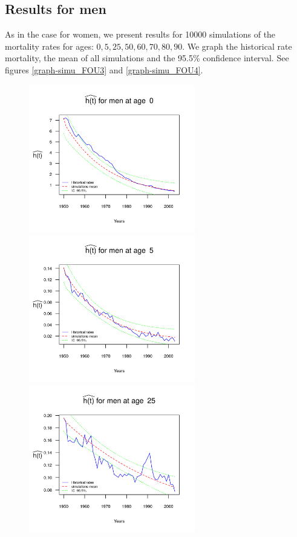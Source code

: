 \documentclass[smallextended]{svjour3}
\begin{document}
\subsection{Results for men}\label{re-men}

As in the case for women, we present results for 10000 simulations of the 
mortality rates for ages: $0,5,25,50,60,70,80,90$.
We graph the historical rate mortality, the mean of all simulations and the 
95.5\% confidence interval. See figures \ref{graph-simu_FOU3} and  
\ref{graph-simu_FOU4}.\\



\begin{figure}[H]
    \includegraphics[width = 2.85in]{PlotMen0.png}
    \includegraphics[width = 2.85in]{PlotMen5.png}
    \includegraphics[width = 2.85in]{PlotMen25.png}

\end{figure}
\end{document}
